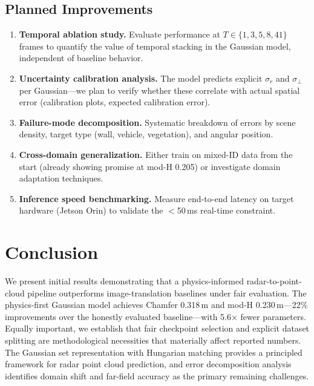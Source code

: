 \documentclass[conference]{IEEEtran}
\begin{document}
\subsection{Planned Improvements}

\begin{enumerate}
  \item \textbf{Temporal ablation study.} Evaluate performance at $T \in \{1, 3, 5, 8, 41\}$ frames to quantify the value of temporal stacking in the Gaussian model, independent of baseline behavior.
  \item \textbf{Uncertainty calibration analysis.} The model predicts explicit $\sigma_r$ and $\sigma_\perp$ per Gaussian---we plan to verify whether these correlate with actual spatial error (calibration plots, expected calibration error).
  \item \textbf{Failure-mode decomposition.} Systematic breakdown of errors by scene density, target type (wall, vehicle, vegetation), and angular position.
  \item \textbf{Cross-domain generalization.} Either train on mixed-ID data from the start (already showing promise at mod-H 0.205) or investigate domain adaptation techniques.
  \item \textbf{Inference speed benchmarking.} Measure end-to-end latency on target hardware (Jetson Orin) to validate the $<$50\,ms real-time constraint.
\end{enumerate}

\section{Conclusion}

We present initial results demonstrating that a physics-informed radar-to-point-cloud pipeline outperforms image-translation baselines under fair evaluation.
The physics-first Gaussian model achieves Chamfer 0.318\,m and mod-H 0.230\,m---22\% improvements over the honestly evaluated baseline---with 5.6$\times$ fewer parameters.
Equally important, we establish that fair checkpoint selection and explicit dataset splitting are methodological necessities that materially affect reported numbers.
The Gaussian set representation with Hungarian matching provides a principled framework for radar point cloud prediction, and error decomposition analysis identifies domain shift and far-field accuracy as the primary remaining challenges.
\end{document}
